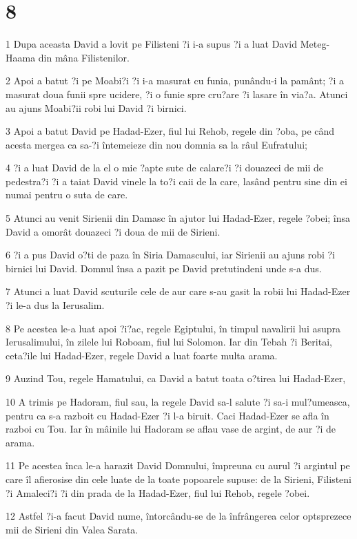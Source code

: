 \chapter{8}

\par 1 Dupa aceasta David a lovit pe Filisteni ?i i-a supus ?i a luat David Meteg-Haama din mâna Filistenilor.
\par 2 Apoi a batut ?i pe Moabi?i ?i i-a masurat cu funia, punându-i la pamânt; ?i a masurat doua funii spre ucidere, ?i o funie spre cru?are ?i lasare în via?a. Atunci au ajuns Moabi?ii robi lui David ?i birnici.
\par 3 Apoi a batut David pe Hadad-Ezer, fiul lui Rehob, regele din ?oba, pe când acesta mergea ca sa-?i întemeieze din nou domnia sa la râul Eufratului;
\par 4 ?i a luat David de la el o mie ?apte sute de calare?i ?i douazeci de mii de pedestra?i ?i a taiat David vinele la to?i caii de la care, lasând pentru sine din ei numai pentru o suta de care.
\par 5 Atunci au venit Sirienii din Damasc în ajutor lui Hadad-Ezer, regele ?obei; însa David a omorât douazeci ?i doua de mii de Sirieni.
\par 6 ?i a pus David o?ti de paza în Siria Damascului, iar Sirienii au ajuns robi ?i birnici lui David. Domnul însa a pazit pe David pretutindeni unde s-a dus.
\par 7 Atunci a luat David scuturile cele de aur care s-au gasit la robii lui Hadad-Ezer ?i le-a dus la Ierusalim.
\par 8 Pe acestea le-a luat apoi ?i?ac, regele Egiptului, în timpul navalirii lui asupra Ierusalimului, în zilele lui Roboam, fiul lui Solomon. Iar din Tebah ?i Beritai, ceta?ile lui Hadad-Ezer, regele David a luat foarte multa arama.
\par 9 Auzind Tou, regele Hamatului, ca David a batut toata o?tirea lui Hadad-Ezer,
\par 10 A trimis pe Hadoram, fiul sau, la regele David sa-l salute ?i sa-i mul?umeasca, pentru ca s-a razboit cu Hadad-Ezer ?i l-a biruit. Caci Hadad-Ezer se afla în razboi cu Tou. Iar în mâinile lui Hadoram se aflau vase de argint, de aur ?i de arama.
\par 11 Pe acestea înca le-a harazit David Domnului, împreuna cu aurul ?i argintul pe care îl afierosise din cele luate de la toate popoarele supuse: de la Sirieni, Filisteni ?i Amaleci?i ?i din prada de la Hadad-Ezer, fiul lui Rehob, regele ?obei.
\par 12 Astfel ?i-a facut David nume, întorcându-se de la înfrângerea celor optsprezece mii de Sirieni din Valea Sarata.
